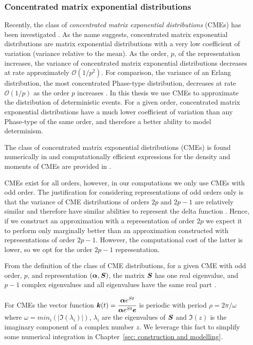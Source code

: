 \subsubsection*{Concentrated matrix exponential distributions}
Recently, the class of \emph{concentrated matrix exponential distributions} (CMEs) has been investigated \citep{ert2006,hstz2016,ert2006,hht2020,mt2021}. As the name suggests, concentrated matrix exponential distributions are matrix exponential distributions with a very low coefficient of variation (variance relative to the mean). As the order, \(p\), of the representation increases, the variance of concentrated matrix exponential distributions decreases at rate approximately \(\mathcal O(1/p^2)\). For comparison, the variance of an Erlang distribution, the most concentrated Phase-type distribution, decreases at rate \(\mathcal O(1/p)\) as the order \(p\) increases \citep{as1987}. In this thesis we use CMEs to approximate the distribution of deterministic events. For a given order, concentrated matrix exponential distributions have a much lower coefficient of variation than any Phase-type of the same order, and therefore a better ability to model determinism. 

The class of concentrated matrix exponential distributions (CMEs) is found numerically in \citep{hht2020} and computationally efficient expressions for the density and moments of CMEs are provided in \citep{hht2020}. 

CMEs exist for all orders, however, in our computations we only use CMEs with odd order. The justification for considering representations of odd orders only is that the variance of CME distributions of orders \(2p\) and \(2p-1\) are relatively similar and therefore have similar abilities to represent the delta function \citep{hht2020}. Hence, if we construct an approximation with a representation of order \(2p\) we expect it to perform only marginally better than an approximation constructed with representations of order \(2p-1\). However, the computational cost of the latter is lower, so we opt for the order \(2p-1\) representation. 

From the definition of the class of CME distributions, for a given CME with odd order, \(p\), and representation \((\boldsymbol\alpha,\boldsymbol S)\), the matrix \(\boldsymbol S\) has one real eigenvalue, and \(p-1\) complex eigenvalues and all eigenvalues have the same real part \cite{hht2020}. 

For CMEs the vector function \(\boldsymbol k(t)=\cfrac{\boldsymbol \alpha e^{St}}{\boldsymbol \alpha e^{St}\boldsymbol e}\) is periodic with period \(\rho = 2\pi/\omega\) where \(\omega=min_i(|\Im(\lambda_i)|)\), \(\lambda_i\) are the eigenvalues of \(\boldsymbol{S}\) and \(\Im(z)\) is the imaginary component of a complex number \(z\). We leverage this fact to simplify some numerical integration in Chapter~\ref{sec: construction and modelling}. 


